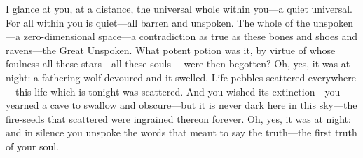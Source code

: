 \documentclass[a4paper]{article}
\begin{document}
I glance at you, at a distance, the universal whole within you---a quiet
universal. For all within you is quiet---all barren and unspoken. The whole of the
unspoken---a zero-dimensional space---a contradiction as true
as these bones and shoes and ravens---the Great Unspoken. What
potent potion was it, by virtue of whose foulness all these stars---all these
souls--- were then begotten? Oh, yes, it was at night: a fathering wolf
devoured and it swelled. Life-pebbles scattered everywhere---this life which is
tonight was scattered. And you wished its extinction---you yearned a cave to
swallow and obscure---but it is never dark here in this sky---the fire-seeds
that scattered were ingrained thereon forever. Oh, yes, it was at night: and in
silence you unspoke the words that meant to say the truth---the first truth of
your soul. 

    
\end{document}
